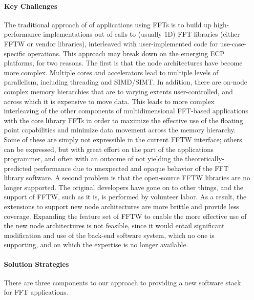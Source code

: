 \paragraph{Key Challenges}
The traditional approach of of applications using FFTs is to build up high-performance implementations out of calls to (usually 1D) FFT libraries (either FFTW or vendor libraries), interleaved with user-implemented code for use-case-specific operations. This approach may break down on the emerging ECP platforms, for two reasons. The first is that the node architectures have become more complex. Multiple cores and accelerators lead to multiple levels of parallelism, including threading and SIMD/SIMT. In addition, there are on-node complex memory hierarchies that are to varying extents user-controlled, and across which it is expensive to move data. This leads to more complex interleaving of the other components of multidimensional FFT-based applications with the core library FFTs in order to maximize the effective use of the floating point capabilities and minimize data movement across the memory hierarchy. Some of these are simply not expressible in the current FFTW interface; others can be expressed, but with great effort on the part of the applications programmer, and often with an outcome of not yielding the theoretically-predicted performance due to unexpected and opaque behavior of the FFT library software. A second problem is that the open-source FFTW libraries are no longer supported. The original developers have gone on to other things, and the support of FFTW, such as it is, is performed by volunteer labor. As a result, the extensions to support new node architectures are more brittle and provide less coverage. Expanding the feature set of FFTW to enable the more effective use of the new node architectures is not feasible, since it would entail significant modification and use of the back-end software system, which no one is supporting, and on which the expertise is no longer available.

\paragraph{Solution Strategies} 
There are three components to our approach to providing a new software stack for FFT applications.


